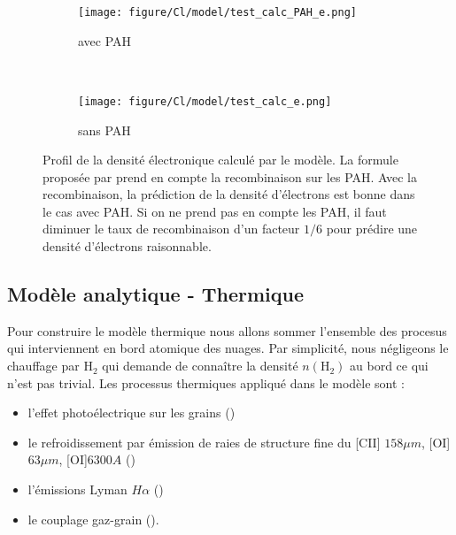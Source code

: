 \begin{figure}[htbp]
    \centering
    \begin{subfigure}[t]{0.49\textwidth} %
        \centering \texttt{[image: figure/Cl/model/test\_calc\_PAH\_e.png]}
        \caption{avec PAH}
    \end{subfigure}
    ~ 
    \begin{subfigure}[t]{0.49\textwidth}
        \centering \texttt{[image: figure/Cl/model/test\_calc\_e.png]}
        \caption{sans PAH}
    \end{subfigure}
    \caption{Profil de la densité électronique calculé par le modèle. La formule proposée par \cite{Weingartner_2001} prend en compte la recombinaison sur les PAH. Avec la recombinaison, la prédiction de la densité d'électrons est bonne dans le cas avec PAH. Si on ne prend pas en compte les PAH, il faut diminuer le taux de recombinaison d'un facteur $1/6$ pour prédire une densité d'électrons raisonnable.}
    \label{fig:Cl:model:rec}
\end{figure}




\subsection{Modèle analytique - Thermique}

Pour construire le modèle thermique nous allons sommer l'ensemble des procesus qui interviennent en bord atomique des nuages. Par simplicité, nous négligeons le chauffage par $\mathrm{H}_2$ qui demande de connaître la densité $n(\mathrm{H}_2)$ au bord ce qui n'est pas trivial. Les processus thermiques appliqué dans le modèle sont :

\begin{itemize}
    \item l'effet photoélectrique sur les grains (\cite{BakesTielens1994})
    \item le refroidissement par émission de raies de structure fine du [CII] $158 \mu m$,  [OI]$63 \mu m$, [OI]$6300A$ (\cite{Rollig2005})
    \item l'émissions Lyman $H\alpha$ (\cite{tielens2005})
    \item le couplage gaz-grain (\cite{Hollenbach1991}).
\end{itemize}{}

